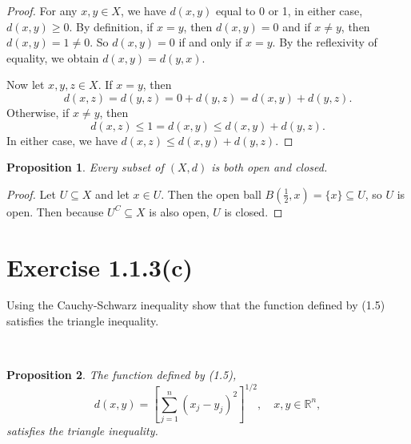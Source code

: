 \documentclass[12pt]{article}
\newcommand{\R}{\mathbb{R}}
\newenvironment{problem}
    {\begin{lrbox}{\mybox}\begin{minipage}{\textwidth-10pt}}
    {\end{minipage}\end{lrbox}\framebox[6.5in]{\usebox{\mybox}}\\}
\newtheorem{proposition}{Proposition}
\begin{document}
\begin{proof}
    For any $x,y\in X$, we have $d(x,y)$ equal to 0 or 1, in either case, $d(x,y)\geq 0$. By definition, if $x=y$, then $d(x,y)=0$ and if $x\ne y$, then $d(x,y)=1\ne0$. So $d(x,y)=0$ if and only if $x=y$. By the reflexivity of equality, we obtain $d(x,y)=d(y,x)$. 
    
    Now let $x,y,z\in X$. If $x=y$, then
    \[d(x,z) = d(y,z) = 0 + d(y,z) = d(x,y) + d(y,z).\]
    Otherwise, if $x\ne y$, then
    \[d(x,z) \leq 1 = d(x,y) \leq d(x,y) + d(y,z).\]
    In either case, we have $d(x,z)\leq d(x,y)+d(y,z)$.
    
\end{proof}

\begin{proposition}
    Every subset of $(X,d)$ is both open and closed.
\end{proposition}

\begin{proof}
    Let $U\subseteq X$ and let $x\in U$. Then the open ball $B(\frac12, x) = \{x\} \subseteq U$, so $U$ is open. Then because $U^C\subseteq X$ is also open, $U$ is closed.
    
\end{proof}

\section*{Exercise 1.1.3(c)}
\begin{problem}
    Using the Cauchy-Schwarz inequality show that the function defined by (1.5) satisfies the triangle inequality.
\end{problem}


\begin{proposition}
    The function defined by (1.5),
    \[d(x,y) = \left[\sum_{j=1}^n(x_j-y_j)^2\right]^{1/2}, \quad x,y\in\R^n,\]
    satisfies the triangle inequality.
\end{proposition}
\end{document}
